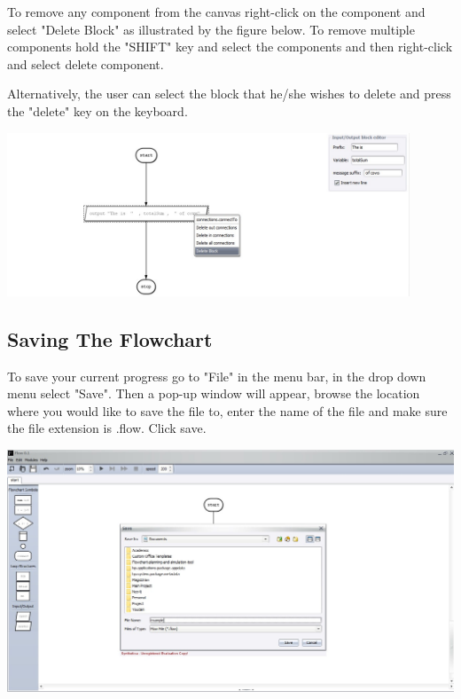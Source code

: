 \documentclass[11pt,a4paper,titlepage]{article}
\begin{document}
	To remove any component from the canvas right-click on the component and select "Delete Block" as illustrated by the figure below. To remove multiple components hold the "SHIFT" key and select the components and then right-click and select delete component.\newline
	
	Alternatively, the user can select the block that he/she wishes to delete and press the "delete" key on the keyboard. \newline
	
	\includegraphics[width=12cm]{images/deleteComponent.jpg} \newline
		
	\subsection{Saving The Flowchart}
	
	To save your current progress go to "File" in the menu bar, in the drop down menu select "Save". Then a pop-up window will appear, browse the location where you would like to save the file to, enter the name of the file and make sure the file extension is .flow. Click save. \newline \newline
	
	\includegraphics[width=14cm]{images/saveFile.jpg}
	
\end{document}
